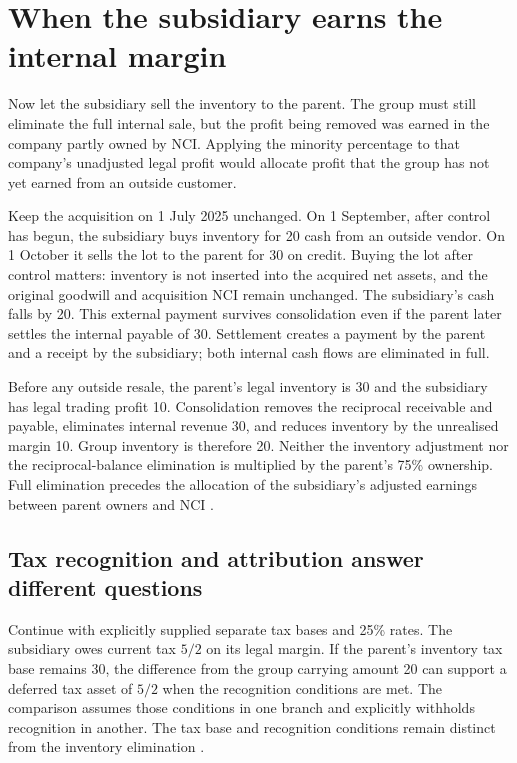\section{When the subsidiary earns the internal margin}
\label{sec:worked-intragroup-upstream}

Now let the subsidiary sell the inventory to the parent. The group must still
eliminate the full internal sale, but the profit being removed was earned in
the company partly owned by NCI. Applying the minority percentage to that
company's unadjusted legal profit would allocate profit that the group has not
yet earned from an outside customer.

Keep the acquisition on 1 July 2025 unchanged. On 1 September, after control
has begun, the subsidiary buys inventory for 20 cash from an outside vendor.
On 1 October it sells the lot to the parent for 30 on credit. Buying the lot
after control matters: inventory is not inserted into the acquired net assets,
and the original goodwill and acquisition NCI remain unchanged. The subsidiary's
cash falls by 20. This external payment survives consolidation even if the
parent later settles the internal payable of 30. Settlement creates a payment
by the parent and a receipt by the subsidiary; both internal cash flows are
eliminated in full.

Before any outside resale, the parent's legal inventory is 30 and the
subsidiary has legal trading profit 10. Consolidation removes the reciprocal
receivable and payable, eliminates internal revenue 30, and reduces inventory
by the unrealised margin 10. Group inventory is therefore 20. Neither the
inventory adjustment nor the reciprocal-balance elimination is multiplied by
the parent's 75\% ownership. Full elimination precedes the allocation of the
subsidiary's adjusted earnings between parent owners and NCI
\citep[paras.~B86, B89--B94]{aasb10control2026}.

\subsection{Tax recognition and attribution answer different questions}

Continue with explicitly supplied separate tax bases and 25\% rates. The
subsidiary owes current tax $5/2$ on its legal margin. If the parent's inventory
tax base remains 30, the difference from the group carrying amount 20 can
support a deferred tax asset of $5/2$ when the recognition conditions are met.
The comparison assumes those conditions in one branch and explicitly withholds
recognition in another. The tax base and recognition conditions remain distinct
from the inventory elimination \citep[paras.~11, 24 and illustrative
example~B11]{aasb112dated}.


